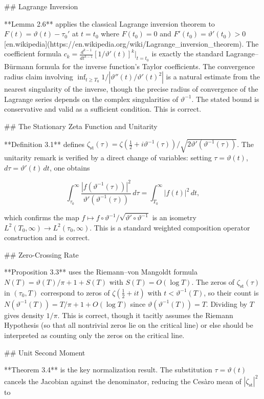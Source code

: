 ## Lagrange Inversion

**Lemma 2.6** applies the classical Lagrange inversion theorem to \(F(t) = \vartheta(t) - \tau_0'\) at \(t = t_0\) where \(F(t_0) = 0\) and \(F'(t_0) = \vartheta'(t_0) > 0\)  [en.wikipedia](https://en.wikipedia.org/wiki/Lagrange_inversion_theorem). The coefficient formula \(c_k = \frac{d^{k-1}}{dt^{k-1}}[1/\vartheta'(t)]^k\big|_{t=t_0}\) is exactly the standard Lagrange–Bürmann formula for the inverse function's Taylor coefficients. The convergence radius claim involving \(\inf_{t \ge T_0} 1/|\vartheta''(t)/\vartheta'(t)^2|\) is a natural estimate from the nearest singularity of the inverse, though the precise radius of convergence of the Lagrange series depends on the complex singularities of \(\vartheta^{-1}\). The stated bound is conservative and valid as a sufficient condition. This is correct.

## The Stationary Zeta Function and Unitarity

**Definition 3.1** defines \(\zeta_{\mathrm{st}}(\tau) = \zeta(\tfrac{1}{2}+i\vartheta^{-1}(\tau))/\sqrt{2\vartheta'(\vartheta^{-1}(\tau))}\). The unitarity remark is verified by a direct change of variables: setting \(\tau = \vartheta(t)\), \(d\tau = \vartheta'(t)\,dt\), one obtains

\[
\int_{\tau_0}^{\infty} \frac{|f(\vartheta^{-1}(\tau))|^2}{\vartheta'(\vartheta^{-1}(\tau))}\,d\tau = \int_{T_0}^{\infty} |f(t)|^2\,dt,
\]

which confirms the map \(f \mapsto f \circ \vartheta^{-1}/\sqrt{\vartheta' \circ \vartheta^{-1}}\) is an isometry \(L^2(T_0,\infty) \to L^2(\tau_0,\infty)\). This is a standard weighted composition operator construction and is correct.

## Zero-Crossing Rate

**Proposition 3.3** uses the Riemann–von Mangoldt formula \(N(T) = \vartheta(T)/\pi + 1 + S(T)\) with \(S(T) = O(\log T)\). The zeros of \(\zeta_{\mathrm{st}}(\tau)\) in \((\tau_0, T)\) correspond to zeros of \(\zeta(\tfrac{1}{2}+it)\) with \(t < \vartheta^{-1}(T)\), so their count is \(N(\vartheta^{-1}(T)) = T/\pi + 1 + O(\log T)\) since \(\vartheta(\vartheta^{-1}(T)) = T\). Dividing by \(T\) gives density \(1/\pi\). This is correct, though it tacitly assumes the Riemann Hypothesis (so that all nontrivial zeros lie on the critical line) or else should be interpreted as counting only the zeros on the critical line.

## Unit Second Moment

**Theorem 3.4** is the key normalization result. The substitution \(\tau = \vartheta(t)\) cancels the Jacobian against the denominator, reducing the Cesàro mean of \(|\zeta_{\mathrm{st}}|^2\) to


